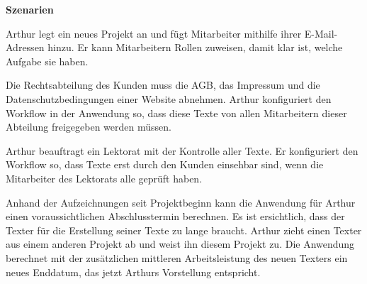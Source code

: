 \begin{multicols}{2}
\textbf{Szenarien}

Arthur legt ein neues Projekt an und fügt Mitarbeiter mithilfe ihrer E-Mail-Adressen hinzu. Er kann Mitarbeitern Rollen zuweisen, damit klar ist, welche Aufgabe sie haben. 

Die Rechtsabteilung des Kunden muss die AGB, das Impressum und die Datenschutzbedingungen einer Website abnehmen. Arthur konfiguriert den Workflow in der Anwendung so, dass diese Texte von allen Mitarbeitern dieser Abteilung freigegeben werden müssen.

Arthur beauftragt ein Lektorat mit der Kontrolle aller Texte. Er konfiguriert den Workflow so, dass Texte erst durch den Kunden einsehbar sind, wenn die Mitarbeiter des Lektorats alle geprüft haben.

Anhand der Aufzeichnungen seit Projektbeginn kann die Anwendung für Arthur einen voraussichtlichen Abschlusstermin berechnen. Es ist ersichtlich, dass der Texter für die Erstellung seiner Texte zu lange braucht. Arthur zieht einen Texter aus einem anderen Projekt ab und weist ihn diesem Projekt zu. Die Anwendung berechnet mit der zusätzlichen mittleren Arbeitsleistung des neuen Texters ein neues Enddatum, das jetzt Arthurs Vorstellung entspricht.

\end{multicols}

\pagebreak
